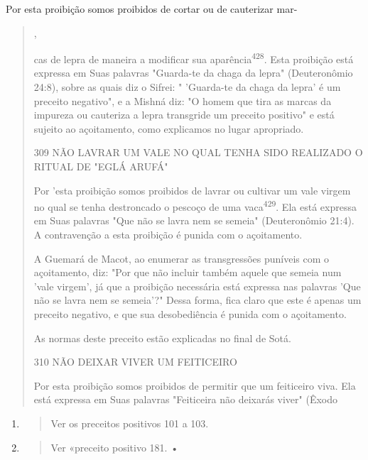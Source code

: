 Por esta proibição somos proibidos de cortar ou de cauterizar mar-

\begin{quote}
,

cas de lepra de maneira a modificar sua aparência\textsuperscript{428}.
Esta proibição está ex­pressa em Suas palavras "Guarda-te da chaga da
lepra" (Deuteronômio 24:8), sobre as quais diz o Sifrei: " 'Guarda-te da
chaga da lepra' é um preceito negati­vo", e a Mishná diz: "O homem que
tira as marcas da impureza ou cauteriza a lepra transgride um preceito
positivo" e está sujeito ao açoitamento, como explicamos no lugar
apropriado.

309 NÃO LAVRAR UM VALE NO QUAL TENHA SIDO REALIZADO O RITUAL DE "EGLÁ
ARUFÁ"

Por 'esta proibição somos proibidos de lavrar ou cultivar um vale
vir­gem no qual se tenha destroncado o pescoço de uma
vaca\textsuperscript{429}. Ela está expres­sa em Suas palavras "Que não
se lavra nem se semeia" (Deuteronômio 21:4). A contravenção a esta
proibição é punida com o açoitamento.

A Guemará de Macot, ao enumerar as transgressões puníveis com o
açoitamento, diz: "Por que não incluir também aquele que semeia num
'vale virgem', já que a proibição necessária está expressa nas palavras
'Que não se lavra nem se semeia'?" Dessa forma, fica claro que este é
apenas um preceito negativo, e que sua desobediência é punida com o
açoitamento.

As normas deste preceito estão explicadas no final de Sotá.

310 NÃO DEIXAR VIVER UM FEITICEIRO

Por esta proibição somos proibidos de permitir que um feiticeiro vi­va.
Ela está expressa em Suas palavras "Feiticeira não deixarás viver"
(Êxodo
\end{quote}

\begin{enumerate}
\def\labelenumi{\arabic{enumi}.}
\setcounter{enumi}{427}
\item
  \begin{quote}
  Ver os preceitos positivos 101 a 103.
  \end{quote}
\item
  \begin{quote}
  Ver «preceito positivo 181. •
  \end{quote}
\end{enumerate}

